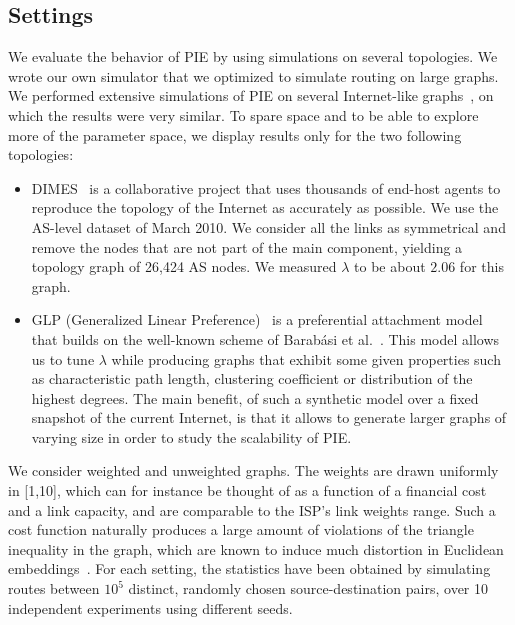 \documentclass[conference]{IEEEtran}
\begin{document}
\subsection{Settings}
We evaluate the behavior of PIE by using simulations on several topologies. 
We wrote our own simulator that we optimized to simulate routing on large graphs. We performed extensive simulations of PIE on several Internet-like graphs~\cite{shavitt:dimes, bu02, barabasi:scaling, bianconi:fit, inet}, on which the results were very similar. To spare space and to be able to explore more of the parameter space, we display results only for the two following topologies:
\begin{itemize}
 \item DIMES~\cite{shavitt:dimes} is a collaborative project that uses thousands of end-host agents to reproduce the topology of the Internet as accurately as possible. We use the AS-level dataset of March 2010. We consider all the links as symmetrical and remove the nodes that are not part of the main component, yielding a topology graph of 26,424 AS nodes. We measured $\lambda$ to be about $2.06$ for this graph.


\item GLP (Generalized Linear Preference)~\cite{bu02} is a preferential attachment model that builds on the well-known scheme of Barab\'{a}si et al.~\cite{barabasi:scaling}.
This model allows us to tune $\lambda$ while producing graphs that 
exhibit some given properties such as characteristic path length, clustering 
coefficient or distribution of the highest degrees. The main benefit, of such a synthetic model over a fixed snapshot of the current Internet, is that it allows to generate larger graphs of varying size in order to study the scalability of PIE.

\end{itemize}


We consider weighted and unweighted graphs. The weights are drawn uniformly in [1,10], which can for instance be thought of as a function of a financial cost and a link capacity, and are comparable to the ISP's link weights range. Such a cost function naturally produces a large amount of violations of the triangle inequality in the graph, which are known to induce much distortion in Euclidean embeddings~\cite{lee:euclidean}.
For each setting, the statistics have been obtained by simulating routes between $10^5$ distinct, randomly chosen source-destination pairs, over 10 independent experiments using different seeds.
\end{document}
